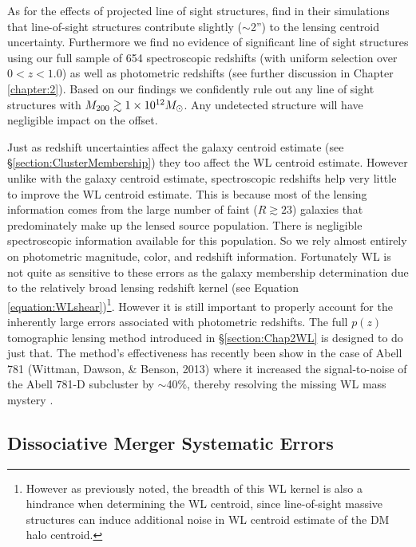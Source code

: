 As for the effects of projected line of sight structures, \citet{Dietrich:2011gs} find in their simulations that line-of-sight structures contribute slightly ($\sim$2'') to the lensing centroid uncertainty.
Furthermore we find no evidence of significant line of sight structures using our full sample of 654 spectroscopic redshifts (with uniform selection over $0<z<1.0$) as well as photometric redshifts (see further discussion in Chapter \ref{chapter:2}). 
Based on our findings we confidently rule out any line of sight structures with $M_{\rm 200}\gtrsim1\times10^{12} M_\odot$.
Any undetected structure will have negligible impact on the offset.

Just as redshift uncertainties affect the galaxy centroid estimate (see \S\ref{section:ClusterMembership}) they too affect the WL centroid estimate.
However unlike with the galaxy centroid estimate, spectroscopic redshifts help very little to improve the WL centroid estimate.
This is because most of the lensing information comes from the large number of faint ($R\gtrsim23$) galaxies that predominately make up the lensed source population.
There is negligible spectroscopic information available for this population. 
So we rely almost entirely on photometric magnitude, color, and redshift information.
Fortunately WL is not quite as sensitive to these errors as the galaxy membership determination due to the relatively broad lensing redshift kernel (see Equation \ref{equation:WLshear})\footnote{However as previously noted, the breadth of this WL kernel is also a hindrance when determining the WL centroid, since line-of-sight massive structures can induce additional noise in WL centroid estimate of the DM halo centroid.}.
However it is still important to properly account for the inherently large errors associated with photometric redshifts.
The full $p(z)$ tomographic lensing method introduced in \S\ref{section:Chap2WL} is designed to do just that.
The method's effectiveness has recently been show in the case of Abell 781 (Wittman, Dawson, \& Benson, 2013) where it increased the signal-to-noise of the Abell 781-D subcluster by $\sim$40\%, thereby resolving the missing WL mass mystery \citep{Cook:2012ka}.


\subsection{Dissociative Merger Systematic Errors}\label{section:MergerSysError}

